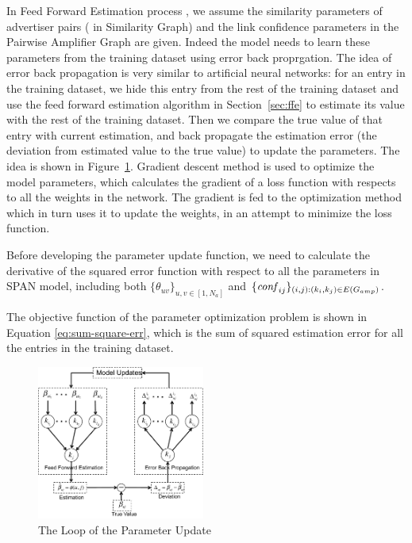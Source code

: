 \documentclass[conference,compsoc]{IEEEtran}
\begin{document}
In Feed Forward Estimation process , we assume the  similarity parameters of advertiser pairs ( in Similarity Graph) and the link confidence parameters in the Pairwise Amplifier Graph are given. Indeed the model needs to learn these parameters  from the training dataset using error back proprgation. 
The idea of error back propagation is very similar to artificial neural networks:  for an entry in the training dataset, we hide this entry from the rest of the training dataset and use the feed forward estimation algorithm in Section~\ref{sec:ffe} to estimate its value with the rest of the training dataset. Then we
compare the true value of that entry with current estimation, and back propagate the estimation error (the deviation from estimated value to the true value) to update the parameters.  The idea is shown in Figure~\ref{fig:trainer-train-entry}.
Gradient descent method \cite{?} is used to optimize the model parameters, which calculates the gradient of a loss function with respects to all the weights in the network. The gradient is fed to the optimization method which in turn uses it to update the weights, in an attempt to minimize the loss function.

Before developing the parameter update function, we need to calculate the derivative of the squared error function with respect to all the parameters in SPAN model, including both $\{\theta_{uv}\}_{u,v\in[1,N_a]}$ and
$\{\mathit{conf}_{ij}\}_{(i,j):(k_i,k_j)\in
  E(G_{amp})}$. 

The objective function of the parameter optimization problem is shown in Equation \ref{eq:sum-square-err}, which is the sum of squared estimation error for all the entries in the training dataset.

\begin{figure}[!ht]
  \centering
  \includegraphics[width=0.49\textwidth]{figures/trainer_train_entry.pdf}
  \caption{The Loop of the Parameter Update}
  \label{fig:trainer-train-entry}
\end{figure}
\end{document}
